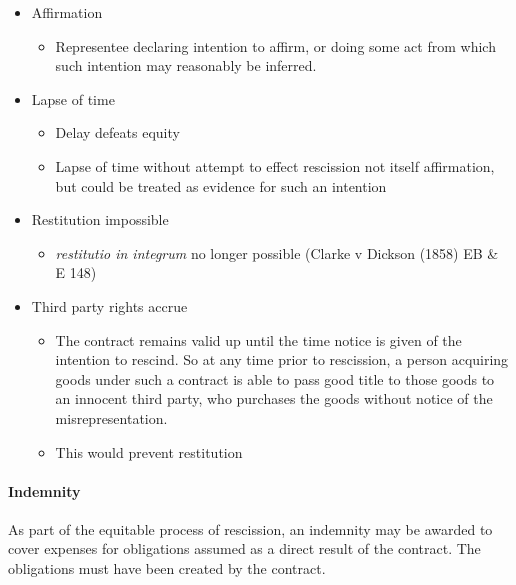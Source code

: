 \documentclass[
]{article}
\providecommand{\tightlist}{%
  \setlength{\itemsep}{0pt}\setlength{\parskip}{0pt}}
\begin{document}
\begin{itemize}
\tightlist
\item
  Affirmation

  \begin{itemize}
  \tightlist
  \item
    Representee declaring intention to affirm, or doing some act from
    which such intention may reasonably be inferred.
  \end{itemize}
\item
  Lapse of time

  \begin{itemize}
  \tightlist
  \item
    Delay defeats equity
  \item
    Lapse of time without attempt to effect rescission not itself
    affirmation, but could be treated as evidence for such an intention
  \end{itemize}
\item
  Restitution impossible

  \begin{itemize}
  \tightlist
  \item
    \emph{restitutio in integrum} no longer possible (Clarke v Dickson
    (1858) EB \& E 148)
  \end{itemize}
\item
  Third party rights accrue

  \begin{itemize}
  \tightlist
  \item
    The contract remains valid up until the time notice is given of the
    intention to rescind. So at any time prior to rescission, a person
    acquiring goods under such a contract is able to pass good title to
    those goods to an innocent third party, who purchases the goods
    without notice of the misrepresentation.
  \item
    This would prevent restitution
  \end{itemize}
\end{itemize}

\hypertarget{indemnity}{%
\paragraph{Indemnity}\label{indemnity}}

As part of the equitable process of rescission, an indemnity may be
awarded to cover expenses for obligations assumed as a direct result of
the contract. The obligations must have been created by the contract.
\end{document}
